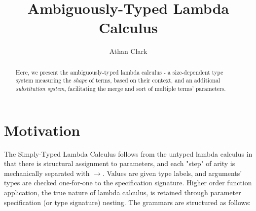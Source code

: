 \documentclass{article}
\begin{document}
\title{Ambiguously-Typed Lambda Calculus}

\author{Athan Clark}

\date{}

\maketitle

\begin{abstract}
\begin{flushleft}
Here, we present the ambiguously-typed lambda calculus - a size-dependent type
system measuring the \textit{shape} of terms, based on their context, and an
additional \textit{substitution system}, facilitating the merge and sort of
multiple terms' parameters.
\end{flushleft}
\end{abstract}

\cite{Author2year2}

\section{Motivation}

The Simply-Typed Lambda Calculus follows from the untyped lambda calculus in that
there is structural assignment to parameters, and each "step" of arity is
mechanically separated with $\rightarrow$. Values are given type labels, and
arguments' types are checked one-for-one to the specification signature. Higher
order function application, the true nature of lambda calculus, is retained
through parameter specification (or type signature) nesting. The grammars are
structured as follows:
\end{document}
